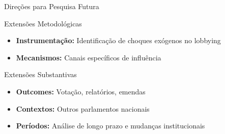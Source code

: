 \documentclass[aspectratio=169]{beamer}
\begin{document}
\begin{frame}{Direções para Pesquisa Futura}
\begin{block}{Extensões Metodológicas}
\begin{itemize}
\item \textbf{Instrumentação:} Identificação de choques exógenos no lobbying
\item \textbf{Mecanismos:} Canais específicos de influência
\end{itemize}
\end{block}

\begin{block}{Extensões Substantivas}
\begin{itemize}
\item \textbf{Outcomes:} Votação, relatórios, emendas
\item \textbf{Contextos:} Outros parlamentos nacionais
\item \textbf{Períodos:} Análise de longo prazo e mudanças institucionais
\end{itemize}
\end{block}
\end{frame}








\end{document}
